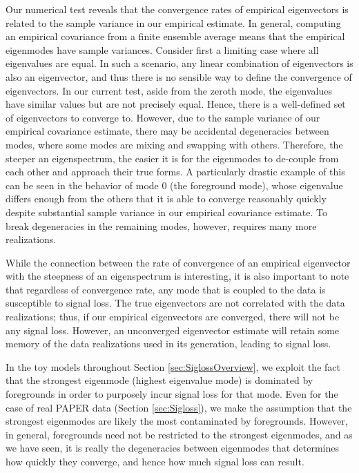 \documentclass[preprint2,numberedappendix,tighten]{aastex6}  %
\begin{document}
Our numerical test reveals that the convergence rates of empirical eigenvectors is related to the sample variance in our empirical estimate. In general, computing an empirical covariance from a finite ensemble average means that the empirical eigenmodes have sample variances. Consider first a limiting case where all eigenvalues are equal. In such a scenario, any linear combination of eigenvectors is also an eigenvector, and thus there is no sensible way to define the convergence of eigenvectors. In our current test, aside from the zeroth mode, the eigenvalues have similar values but are not precisely equal. Hence, there is a well-defined set of eigenvectors to converge to. However, due to the sample variance of our empirical covariance estimate, there may be accidental degeneracies between modes, where some modes are mixing and swapping with others. Therefore, the steeper an eigenspectrum, the easier it is for the eigenmodes to de-couple from each other and approach their true forms. A particularly drastic example of this can be seen in the behavior of mode $0$ (the foreground mode), whose eigenvalue differs enough from the others that it is able to converge reasonably quickly despite substantial sample variance in our empirical covariance estimate. To break degeneracies in the remaining modes, however, requires many more realizations.

While the connection between the rate of convergence of an empirical eigenvector with the steepness of an eigenspectrum is interesting, it is also important to note that regardless of convergence rate, any mode that is coupled to the data is susceptible to signal loss. The true eigenvectors are not correlated with the data realizations; thus, if our empirical eigenvectors are converged, there will not be any signal loss. However, an unconverged eigenvector estimate will retain some memory of the data realizations used in its generation, leading to signal loss.

In the toy models throughout Section \ref{sec:SiglossOverview}, we exploit the fact that the strongest eigenmode (highest eigenvalue mode) is dominated by foregrounds in order to purposely incur signal loss for that mode. Even for the case of real PAPER data (Section \ref{sec:Sigloss}), we make the assumption that the strongest eigenmodes are likely the most contaminated by foregrounds. However, in general, foregrounds need not be restricted to the strongest eigenmodes, and as we have seen, it is really the degeneracies between eigenmodes that determines how quickly they converge, and hence how much signal loss can result.
\end{document}
